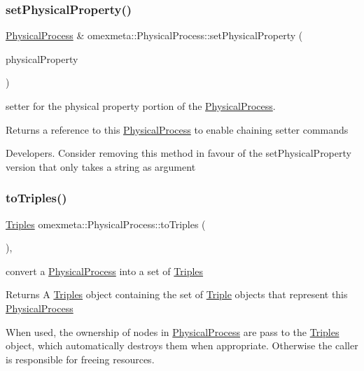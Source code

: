 \subsubsection{\texorpdfstring{set\+Physical\+Property()}{setPhysicalProperty()}\hspace{0.1cm}{\footnotesize\ttfamily [2/2]}}
{\footnotesize\ttfamily \hyperlink{classomexmeta_1_1PhysicalProcess}{Physical\+Process} \& omexmeta\+::\+Physical\+Process\+::set\+Physical\+Property (\begin{DoxyParamCaption}\item[{\hyperlink{classomexmeta_1_1PhysicalProperty}{Physical\+Property}}]{physical\+Property }\end{DoxyParamCaption})}



setter for the physical property portion of the \hyperlink{classomexmeta_1_1PhysicalProcess}{Physical\+Process}. 

\begin{DoxyReturn}{Returns}
a reference to this \hyperlink{classomexmeta_1_1PhysicalProcess}{Physical\+Process} to enable chaining setter commands
\end{DoxyReturn}
Developers. Consider removing this method in favour of the set\+Physical\+Property version that only takes a string as argument \mbox{\label{classomexmeta_1_1PhysicalProcess_ab6f6af00fac2401f9a88e186fd1d897a}} 
\subsubsection{\texorpdfstring{to\+Triples()}{toTriples()}}
{\footnotesize\ttfamily \hyperlink{classomexmeta_1_1Triples}{Triples} omexmeta\+::\+Physical\+Process\+::to\+Triples (\begin{DoxyParamCaption}{ }\end{DoxyParamCaption})\hspace{0.3cm}{\ttfamily [override]}, {\ttfamily [virtual]}}



convert a \hyperlink{classomexmeta_1_1PhysicalProcess}{Physical\+Process} into a set of \hyperlink{classomexmeta_1_1Triples}{Triples} 

\begin{DoxyReturn}{Returns}
A \hyperlink{classomexmeta_1_1Triples}{Triples} object containing the set of \hyperlink{classomexmeta_1_1Triple}{Triple} objects that represent this \hyperlink{classomexmeta_1_1PhysicalProcess}{Physical\+Process}
\end{DoxyReturn}
When used, the ownership of nodes in \hyperlink{classomexmeta_1_1PhysicalProcess}{Physical\+Process} are pass to the \hyperlink{classomexmeta_1_1Triples}{Triples} object, which automatically destroys them when appropriate. Otherwise the caller is responsible for freeing resources. 

